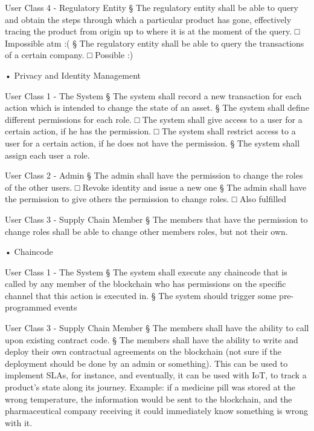 		\par User Class 4 - Regulatory Entity
			§ The regulatory entity shall be able to query and obtain the steps through which a particular product has gone, effectively tracing the product from origin up to where it is at the moment of the query.
				□ Impossible atm :(
			§  The regulatory entity shall be able to query the transactions of a certain company.
				□ Possible :)
			
		
	• Privacy and Identity Management
		\par User Class 1 - The System
			§ The system shall record a new transaction for each action which is intended to change the state of an asset.
			§ The system shall define different permissions for each role.
				□ The system shall give access to a user for a certain action, if he has the permission.
				□ The system shall restrict access to a user for a certain action, if he does not have the permission.
			§ The system shall assign each user a role.
		
		\par User Class 2 - Admin
			§ The admin shall have the permission to change the roles of the other users.
				□ Revoke identity and issue a new one
			§ The admin shall have the permission to give others the permission to change roles.
				□ Also fulfilled
		
		\par User Class 3 - Supply Chain Member
			§ The members that have the permission to change roles shall be able to change other members roles, but not their own.

	• Chaincode

		\par User Class 1 - The System
			§ The system shall execute any chaincode that is called by any member of the blockchain who has permissions on the specific channel that this action is executed in.
			§ The system should trigger some pre-programmed events
		\par User Class 3 - Supply Chain Member
			§ The members shall have the ability to call upon existing contract code.
			§ The members shall have the ability to write  and deploy their own contractual agreements on the blockchain (not sure if the deployment should be done by an admin or something). This can be used to implement SLAs, for instance, and eventually, it can be used with IoT, to track a product's state along its journey. Example: if a medicine pill was stored at the wrong temperature, the information would be sent to the blockchain, and the pharmaceutical company receiving it could immediately know something is wrong with it.
			
